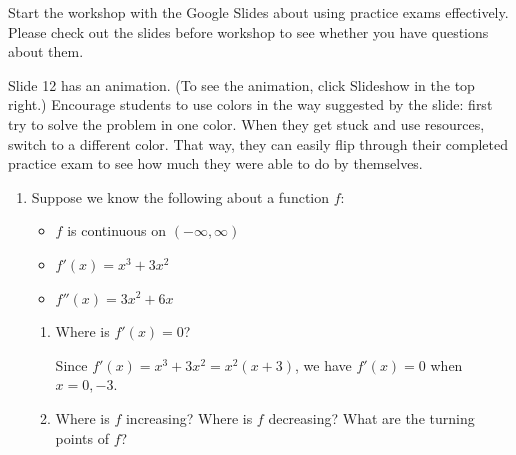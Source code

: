 \documentclass{article}
\begin{document}

\begin{workshop}
  Start the workshop with the Google Slides about using practice exams effectively. Please check out the slides before workshop to see whether you have questions about them. 

  Slide 12 has an animation. (To see the animation, click Slideshow in the top right.) Encourage students to use colors in the way suggested by the slide: first try to solve the problem in one color. When they get stuck and use resources, switch to a different color. That way, they can easily flip through their completed practice exam to see how much they were able to do by themselves. 
\end{workshop}

\begin{enumerate}
\item  \label{2023-e1practice-graphing-1-v1} 

  Suppose we know the following about a function $f$:
  \begin{itemize}[nosep]
  \item $f$ is continuous on $(-\infty, \infty)$
  \item $f'(x) = x^3 + 3x^2$
  \item $f''(x) = 3x^2 + 6x$
  \end{itemize}
  \begin{enumerate}

  \item
    \begin{problem}[\stretch{0.25}]
      Where is $f'(x) = 0$? 
    \end{problem}

    \begin{solution}
      Since $f'(x) = x^3 + 3x^2 = x^2 (x + 3)$, we have $f'(x) = 0$ when $x = \boxed{0, -3}$. 
    \end{solution}

  \item
    \begin{problem}[\vfill]
      Where is $f$ increasing? Where is $f$ decreasing? What are the turning points of $f$?
    \end{problem}


\end{enumerate}
\end{enumerate}
\end{document}
